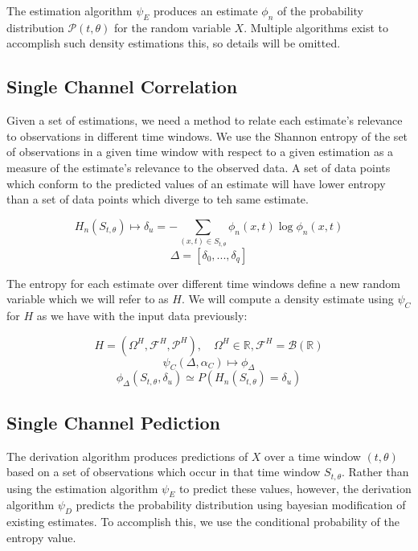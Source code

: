 \documentclass[10pt]{article}
\begin{document}
The estimation algorithm \(\psi_{E} \) produces an estimate \(\phi_n \) of the probability distribution \( \mathcal{P}(t,\theta) \) for the random variable \( X \).  Multiple algorithms exist to accomplish such density estimations this, so details will be omitted.

\subsection{Single Channel Correlation}

Given a set of estimations, we need a method to relate each estimate's relevance to observations in different time windows.  We use the Shannon entropy of the set of observations in a given time window with respect to a given estimation as a measure of the estimate's relevance to the observed data.  A set of data points which conform to the predicted values of an estimate will have lower entropy than a set of data points which diverge to teh same estimate.

\begin{equation} H_n( S_{t,\theta} ) \mapsto \delta_u = -\sum_{(x,t) \in S_{t,\theta}} \phi_n(x,t) \log \phi_n(x,t) \end{equation}
\[ \Delta = [\delta_0,...,\delta_q] \]

The entropy for each estimate over different time windows define a new random variable which we will refer to as \( H \).  We will compute a density estimate using \(\psi_C \) for \( H \) as we have with the input data previously:

\[ H = ( \Omega^H, \mathcal{F}^H, \mathcal{P}^H ), \quad \Omega^H \in \mathbb{R}, \mathcal{F}^H = \mathcal{B}(\mathbb{R}) \]
\begin{equation} \psi_C( \Delta , \alpha_C ) \mapsto \phi_\Delta \end{equation}
\begin{equation} \phi_\Delta(S_{t,\theta},\delta_u) \simeq P \left( H_n(S_{t,\theta}) = \delta_u \right)
\end{equation}

\subsection{Single Channel Pediction}
The derivation algorithm produces predictions of \(X \) over a time window \( (t,\theta) \) based on a set of observations which occur in that time window \(S_{t,\theta} \).  Rather than using the estimation algorithm \(\psi_E \) to predict these values, however, the derivation algorithm \(\psi_D \) predicts the probability distribution  using bayesian modification of existing estimates.  To accomplish this, we use the conditional probability of the entropy value.
\end{document}
